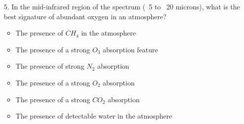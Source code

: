 \begin{enumerate}
\item[5.] In the mid-infrared region of the spectrum (~5 to ~20 microns), what is the best signature of  abundant oxygen in an atmosphere?

\begin{itemize}[label={$\bullet$}]
    \item The presence of $CH_4$ in the atmosphere
    \item The presence of a strong $O_3$ absorption feature
    \item The presence of strong $N_2$ absorption
    \item The presence of a strong $O_2$ absorption
    \item The presence of a strong $CO_2$ absorption
    \item The presence of detectable water in the atmosphere
\end{itemize}

\end{enumerate}

